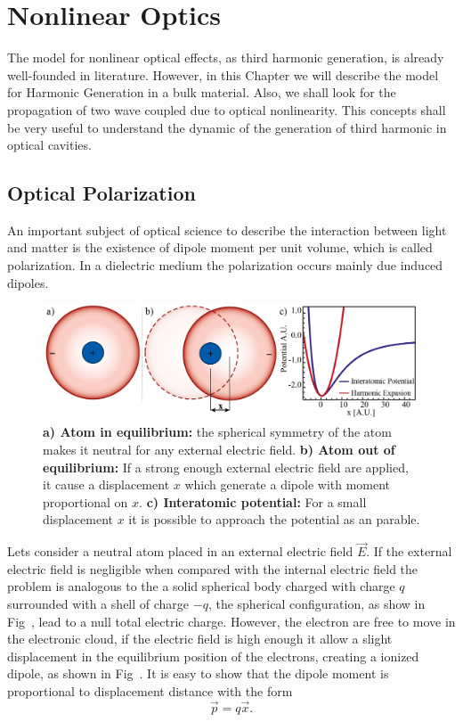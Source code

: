 \chapter{Nonlinear Optics}
\label{chap:nonlin_pol}
The model for nonlinear optical effects, as third harmonic generation, is already well-founded in literature. However, in this Chapter we will describe the model for Harmonic Generation in a bulk material. Also, we shall look for the propagation of two wave coupled due to optical nonlinearity. This concepts shall be very useful to understand the dynamic of the generation of third harmonic in optical cavities.  

\section{Optical Polarization}
\label{sec:Optical_nonlinear}
An important subject of optical science to describe the interaction between light and matter is the existence of dipole moment per unit volume, which is called polarization. In a dielectric medium the polarization occurs mainly due induced dipoles.

\begin{figure}[h!]
    \centering
    \includegraphics[width = 16cm]{figuras/Dissertation_atomic_polarization.jpg}
    \caption{\textbf{a) Atom in equilibrium:} the spherical symmetry of the atom makes it neutral for any external electric field. \textbf{b) Atom out of equilibrium:} If a strong enough external electric field are applied, it cause a displacement $x$ which generate a dipole with moment proportional on $x$. \textbf{c) Interatomic potential:} For a small displacement $x$ it is possible to approach the potential as an parable.}
    \label{fig:polarization}
\end{figure}
Lets consider a neutral atom placed in an external electric field $\vec{E}$. If the external electric field is negligible when compared with the internal electric field the problem is analogous to the a solid spherical body charged with charge $q$ surrounded with a shell of charge $-q$, the spherical configuration, as show in Fig~, lead to a null total electric charge\needcit. However, the electron are free to move in the electronic cloud, if the electric field is high enough it allow a slight displacement in the equilibrium position of the electrons, creating a ionized dipole, as shown in Fig~. It is easy to show that the dipole moment is proportional to displacement distance with the form
\begin{equation}
    \vec{p} = q\vec{x}.
\end{equation}

